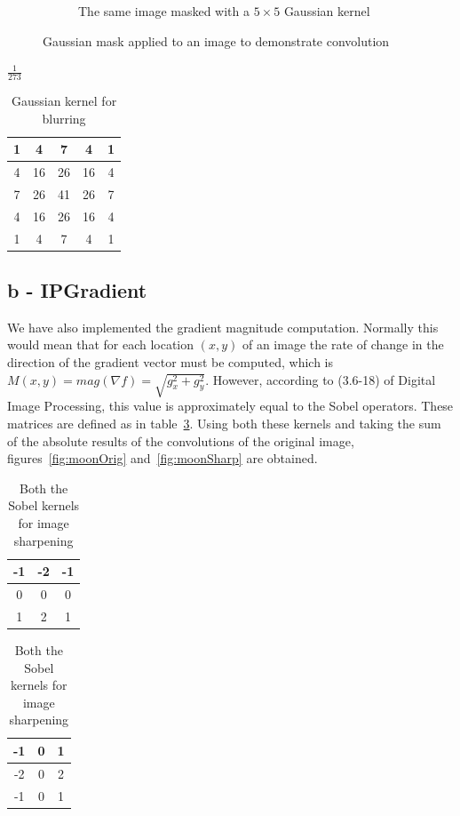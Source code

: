 \begin{figure}[!htb]
\begin{subfigure}[b]{0.49\linewidth}
  \caption{The same image masked with a \(5\times5\) Gaussian kernel}
  \label{fig:blur}
 \end{subfigure}
 \caption{Gaussian mask applied to an image to demonstrate convolution}
\end{figure}
\begin{table}[!htb]
\begin{center}
$\frac{1}{273}$
\begin{tabular}{|c|c|c|c|c|}\hline
1 & 4 & 7 & 4 & 1\\ \hline
4 &  16 &  26 &  16 &  4 \\ \hline
7 &  26 &  41 &  26 &  7\\ \hline
4 &  16 &  26 &  16 &  4\\ \hline
1 &  4 &  7 &  4 &  1 \\ \hline
\end{tabular}

\caption{Gaussian kernel for blurring}
\label{tbl:gauss}
\end{center}
\end{table}

\subsection*{b - IPGradient}
We have also implemented the gradient magnitude computation. Normally this would mean that for each location $(x, y)$ of an image the rate of change in the direction of the gradient vector must be computed, which is $M(x, y) = mag(\nabla f) = \sqrt{g_x ^2 + g_y ^2}$. However, according to (3.6-18) of Digital Image Processing\cite[p.~189]{gonzalez2002digital}, this value is approximately equal to the Sobel operators. These matrices are defined as in table~\ref{tbl:sobel}. Using both these kernels and taking the sum of the absolute results of the convolutions of the original image, figures~\ref{fig:moonOrig} and~\ref{fig:moonSharp} are obtained. 
\begin{table}[!htb]
\begin{center}
\begin{tabular}{|c|c|c|}\hline
-1 & -2 & -1 \\ \hline
0 & 0 & 0 \\ \hline
1 & 2 & 1 \\ \hline
\end{tabular}
\begin{tabular}{|c|c|c|}\hline
-1 & 0 & 1 \\ \hline
-2 & 0 & 2 \\ \hline
-1 & 0 & 1 \\ \hline
\end{tabular}

\caption{Both the Sobel kernels for image sharpening}
\label{tbl:sobel}
\end{center}
\end{table}

